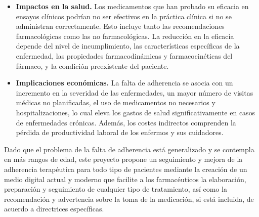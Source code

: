 \begin{itemize}
	\item \textbf{Impactos en la salud.} Los medicamentos que han probado su eficacia en ensayos clínicos podrían no ser efectivos en la práctica clínica si no se administran correctamente. Esto incluye tanto las recomendaciones farmacológicas como las no farmacológicas. La reducción en la eficacia depende del nivel de incumplimiento, las características específicas de la enfermedad, las propiedades farmacodinámicas y farmacocinéticas del fármaco, y la condición preexistente del paciente. \cite{libroblanco2021} 
	
	\item \textbf{Implicaciones económicas.} La falta de adherencia se asocia con un incremento en la severidad de las enfermedades, un mayor número de visitas médicas no planificadas, el uso de medicamentos no necesarios y hospitalizaciones, lo cual eleva los gastos de salud significativamente en casos de enfermedades crónicas. Además, los costes indirectos comprenden la pérdida de productividad laboral de los enfermos y sus cuidadores. \cite{libroblanco2021}
\end{itemize}

Dado que el problema de la falta de adherencia está generalizado y se contempla en más rangos de edad, este proyecto propone un seguimiento y mejora de la adherencia terapéutica para todo tipo de pacientes mediante la creación de un medio digital actual y moderno que facilite a los farmacéuticos la elaboración, preparación y seguimiento de cualquier tipo de tratamiento, así como la recomendación y advertencia sobre la toma de la medicación, si está incluida, de acuerdo a directrices específicas.

